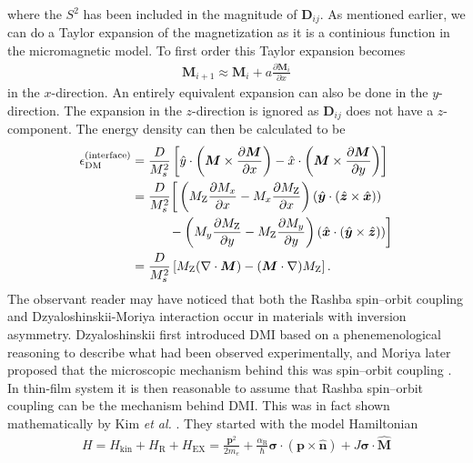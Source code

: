 where the $S^2$ has been included in the magnitude of $\mathbold{D}_{ij}$. As mentioned earlier, we can do a Taylor expansion of the magnetization as it is a continious function in the micromagnetic model. To first order this Taylor expansion becomes
\begin{align}
    \mathbold{M}_{i+1} \approx \mathbold{M}_i + a\frac{\partial\mathbold{M}_i}{\partial x}
\end{align}
in the $x$-direction. An entirely equivalent expansion can also be done in the $y$-direction. The expansion in the $z$-direction is ignored as $\mathbold{D}_{ij}$ does not have a $z$-component. The energy density can then be calculated to be
\begin{subequations}
\begin{align}
\nonumber\epsilon_{\text{DM}}^{\textrm{(interface)}} &= 
\frac{D}{M_s^2}\left[\hat{y}\cdot\left(\mathbold{M}\times\frac{\partial\mathbold{M}}{\partial x}\right) - \hat{x}\cdot\left(\mathbold{M}\times\frac{\partial\mathbold{M}}{\partial y}\right)\right] \\
\nonumber&= \frac{D}{M_s^2} \bigg[\left(M_{\text{Z}}\frac{\partial M_x}{\partial x} - M_x \frac{\partial M_{\text{Z}}}{\partial x}\right)(\mathbold{\hat{y}}\cdot(\mathbold{\hat{z}}\times\mathbold{\hat{x}}))\\
\label{eq:DMInterfaceCrossP}
&\hspace{10.4mm}- \left(M_y\frac{\partial M_{\text{Z}}}{\partial y} - M_{\text{Z}} \frac{\partial M_y}{\partial y}\right)(\mathbold{\hat{x}}\cdot(\mathbold{\hat{y}}\times\mathbold{\hat{z}}))\bigg] \\
\label{eq:DMInterface}
&= \frac{D}{M_s^2}\left[M_{\text{Z}}(\mathbold{\nabla}\cdot\mathbold{M})-(\mathbold{M}\cdot\mathbold{\nabla})M_{\text{Z}}\right].
\end{align}
\end{subequations}
The observant reader may have noticed that both the Rashba spin--orbit coupling and Dzyaloshinskii-Moriya interaction occur in materials with inversion asymmetry. Dzyaloshinskii first introduced DMI based on a phenemenological reasoning \citep{Dzyaloshinskii1958} to describe what had been observed experimentally, and Moriya later proposed that the microscopic mechanism behind this was spin--orbit coupling \cite{Moriya1960}. In thin-film system it is then reasonable to assume that Rashba spin--orbit coupling can be the mechanism behind DMI. This was in fact shown mathematically by Kim \textit{et al.} \citep{DMIfromRashba_Kim}. They started with the model Hamiltonian
\begin{align}
H = H_{\textrm{kin}} + H_{\text{R}} + H_{\text{EX}} = \frac{\mathbold{p}^2}{2m_e} + \frac{\alpha_{\text{R}}}{\hbar}\mathbold{\sigma}\cdot(\mathbold{p}\times\mathbold{\hat{n}}) + J\mathbold{\sigma}\cdot\mathbold{\hat{M}}
\end{align}
